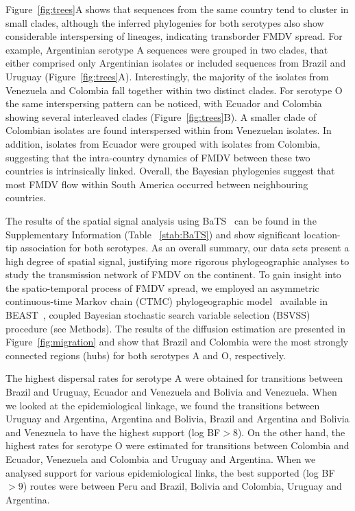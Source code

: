 \documentclass[10pt]{article}
\begin{document}
Figure~\ref{fig:trees}A shows that sequences from the same country tend to cluster in small clades, although the inferred phylogenies for both serotypes also show considerable interspersing of lineages, indicating transborder FMDV spread.
For example, Argentinian serotype A sequences were grouped in two clades, that either comprised only Argentinian isolates or included sequences from Brazil and Uruguay (Figure~\ref{fig:trees}A).
Interestingly, the majority of the isolates from Venezuela and Colombia fall together within two distinct clades.
For serotype O the same interspersing pattern can be noticed, with Ecuador and Colombia showing several interleaved clades (Figure~\ref{fig:trees}B).
A smaller clade of Colombian isolates are found interspersed within from Venezuelan isolates.
In addition, isolates from Ecuador were grouped with isolates from Colombia, suggesting that the intra-country dynamics of FMDV between these two countries is intrinsically linked.
Overall, the Bayesian phylogenies suggest that most FMDV flow within South America occurred between neighbouring countries. 


The results of the spatial signal analysis using BaTS~\cite{bats} can be found in the Supplementary Information (Table ~\ref{stab:BaTS}) and show significant location-tip association for both serotypes.
As an overall summary, our data sets present a high degree of spatial signal, justifying more rigorous phylogeographic analyses to study the transmission network of FMDV on the continent.
To gain insight into the spatio-temporal process of FMDV spread, we employed an asymmetric continuous-time Markov chain (CTMC) phylogeographic model~\cite{roots} available in BEAST~\cite{beast2012}, coupled Bayesian stochastic search variable selection (BSVSS) procedure (see Methods).
The results of the diffusion estimation are presented in Figure~\ref{fig:migration} and show that Brazil and Colombia were the most strongly connected regions (hubs) for both serotypes A and O, respectively. %

The highest dispersal rates for serotype A were obtained for transitions between Brazil and Uruguay, Ecuador and Venezuela and Bolivia and Venezuela.
When we looked at the epidemiological linkage, we found the transitions between Uruguay and Argentina, Argentina and Bolivia, Brazil and Argentina and Bolivia and Venezuela to have the highest support (log BF$>8$).
On the other hand, the highest rates for serotype O were estimated for transitions between Colombia and Ecuador, Venezuela and Colombia and Uruguay and Argentina.
When we analysed support for various epidemiological links, the best supported (log BF$>9$) routes were between Peru and Brazil, Bolivia and Colombia, Uruguay and Argentina.
\end{document}
